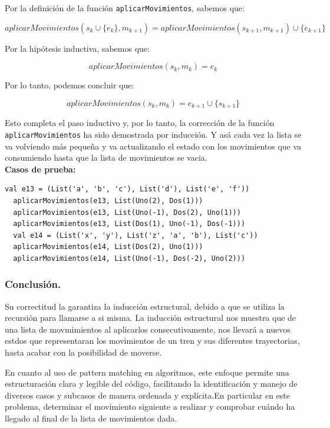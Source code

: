 \documentclass[12pt, a4paper]{article}
\begin{document}
Por la definición de la función \texttt{aplicarMovimientos}, sabemos que:

\[ aplicarMovimientos(s_k \cup \{e_{k}\}, m_{k+1} ) = aplicarMovimientos(s_{k+1}, m_{k+1}) \cup \{e_{k+1}\} \]

Por la hipótesis inductiva, sabemos que:

\[ aplicarMovimientos(s_{k}, m_k) = e_k \]

Por lo tanto, podemos concluir que:

\[ aplicarMovimientos(s_k, m_k) = e_{k+1} \cup \{s_{k+1}\} \]

Esto completa el paso inductivo y, por lo tanto, la corrección de la función \texttt{aplicarMovimientos} ha sido demostrada por inducción. Y asá cada vez la lista se va volviendo más pequeña y va actualizando el estado con los movimientos que va consumiendo hasta que la lista de movimientos se vacia. \\


  
\textbf{Casos de prueba: } \\
\begin{lstlisting}[caption=Para ver los valores esperados por favor referirse al archivo de pruebas.sc. Debido a que los resultados son tan extensos que dañan la estructura del documento., label=lst:scala_code]
  val e13 = (List('a', 'b', 'c'), List('d'), List('e', 'f'))
  aplicarMovimientos(e13, List(Uno(2), Dos(1)))
  aplicarMovimientos(e13, List(Uno(-1), Dos(2), Uno(1)))
  aplicarMovimientos(e13, List(Dos(1), Uno(-1), Dos(-1)))
  val e14 = (List('x', 'y'), List('z', 'a', 'b'), List('c'))
  aplicarMovimientos(e14, List(Dos(2), Uno(1)))
  aplicarMovimientos(e14, List(Uno(-1), Dos(-2), Uno(2)))
  \end{lstlisting}
\subsubsection{Conclusión.}
Su correctitud la garantiza la inducción estructural, debido a que  se utiliza la recursión para llamarse a si misma. La inducción estructural nos muestra que de una lista de movmimientos al aplicarlos consecutivamente, nos llevará a nuevos estdos que representaran los movimientos de un tren y sus diferentes trayectorias, hasta acabar con la posibilidad de moverse.

En cuanto al uso de pattern matching en algoritmos, este enfoque permite una estructuración clara y legible del código, facilitando la identificación y manejo de diversos casos y subcasos de manera ordenada y explícita.En particular en este problema, determinar el movimiento siguiente a realizar y comprobar cuándo ha llegado al final de la lista de movimientos dada.
\end{document}
